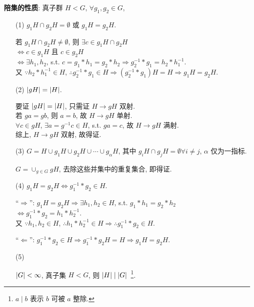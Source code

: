 \documentclass{note}
\begin{document}
\textbf{陪集的性质}: 真子群 $H<G$, $\forall g_1,g_2\in G$,
\begin{itemize}
    \item[(1)] $g_1H\cap g_2H=\emptyset$ 或 $g_1H=g_2H$.
    \begin{pf}
        若 $g_1H\cap g_2H\neq\emptyset$, 则 $\exists c\in g_1H\cap g_2H$\\
        $\Longleftrightarrow c\in g_1H$ 且 $c\in g_2H$\\
        $\Longleftrightarrow\exists h_1,h_2$, s.t. $c=g_1*h_1=g_2*h_2\Longrightarrow g_2^{-1}*g_1=h_2*h_1^{-1}$.\\
        又 $\because h_2*h_1^{-1}\in H$, $\therefore g_2^{-1}*g_1\in H\Longrightarrow(g_2^{-1}*g_1)H=H\Longrightarrow g_1H=g_2H$.
    \end{pf}
    \item[(2)] $\left\lvert gH\right\rvert=\left\lvert H\right\rvert$.
    \begin{pf}
        要证 $\left\lvert gH\right\rvert=\left\lvert H\right\rvert$, 只需证 $H\rightarrow gH$ 双射.\\
        若 $ga=gb$, 则 $a=b$, 故 $H\rightarrow gH$ 单射.\\
        $\forall c\in gH$, $\exists a=g^{-1}c\in H$, s.t. $ga=c$, 故 $H\rightarrow gH$ 满射.\\
        综上, $H\rightarrow gH$ 双射, 故得证.
    \end{pf}
    \item[(3)] $G=H\cup g_1H\cup g_2H\cup\cdots\cup g_{\alpha}H$, 其中 $g_iH\cap g_jH=\emptyset\forall i\neq j$, $\alpha$ 仅为一指标.
    \begin{pf}
        $G=\cup_{g\in G}gH$, 去除这些并集中的重复集合, 即得证.
    \end{pf}
    \item[(4)] $g_1H=g_2H\Longleftrightarrow g_1^{-1}*g_2\in H$.
    \begin{pf}
        ``$\Longrightarrow$'': $g_1H=g_2H\Longrightarrow\exists h_1,h_2\in H$, s.t. $g_1*h_1=g_2*h_2$\\
        $\Longleftrightarrow g_1^{-1}*g_2=h_1*h_2^{-1}$.\\
        又 $\because h_1,h_2\in H$, $\therefore h_1*h_2^{-1}\in H\Longrightarrow\therefore g_1^{-1}*g_2\in H$.

        ``$\Longleftarrow$'': $g_1^{-1}*g_2\in H\Longrightarrow g_1^{-1}*g_2H=H\Longrightarrow g_1H=g_2H$.
    \end{pf}
    \item[(5)] ~\begin{thm}
        $\left\lvert G\right\rvert<\infty$, 真子集 $H<G$, 则 $\left\lvert H\right\rvert\mid\left\lvert G\right\rvert$~\footnote{$a\mid b$ 表示 $b$ 可被 $a$ 整除.}.
    \end{thm}


\end{itemize}
\end{document}
